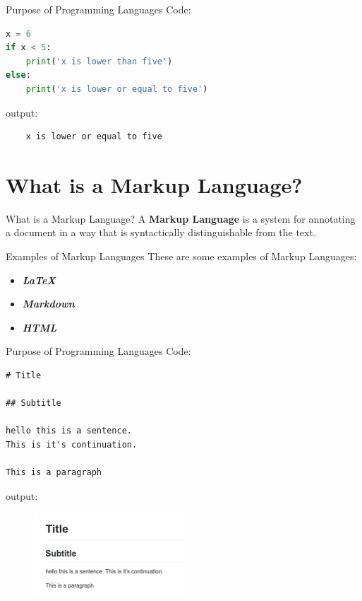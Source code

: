\documentclass[compress]{beamer}
\begin{document}
\begin{frame}[fragile]{Purpose of Programming Languages}
Code:
\begin{lstlisting}[language=python]
x = 6
if x < 5:
    print('x is lower than five')
else:
    print('x is lower or equal to five')
\end{lstlisting}
output:
\begin{lstlisting}
    x is lower or equal to five
\end{lstlisting}
\end{frame}
\section{What is a Markup Language?}
\begin{frame}{What is a Markup Language?}
A \textbf{Markup Language} is a system for annotating a document in a way that is syntactically distinguishable from the text.
\end{frame}

\begin{frame}{Examples of Markup Languages}
These are some examples of Markup Languages:
\begin{itemize}
    \item \textit{\textbf{\LaTeX}}
    \item \textit{\textbf{Markdown}}
    \item \textit{\textbf{HTML}}
\end{itemize}
\end{frame}

\begin{frame}[fragile]{Purpose of Programming Languages}
Code:
\begin{lstlisting}
# Title

## Subtitle

hello this is a sentence. 
This is it's continuation.

This is a paragraph

\end{lstlisting}
output:
\begin{figure}
    \centering
    \includegraphics[width=0.5\textwidth]{img/MarkdownPreview.png}
\end{figure}
\end{frame}
\end{document}
